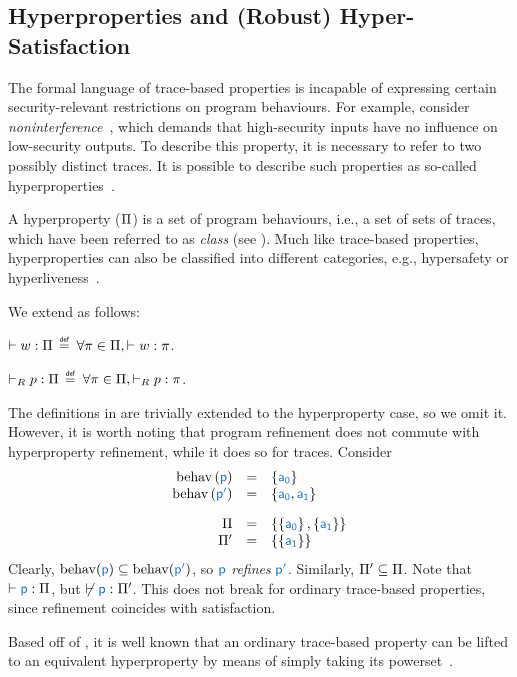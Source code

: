 \subsection{Hyperproperties and (Robust) Hyper-Satisfaction}\label{subsec:bg:hprop}

The formal language of trace-based properties is incapable of expressing certain security-relevant restrictions on program behaviours.
For example, consider {\em noninterference}~\cite{}, which demands that high-security inputs have no influence on low-security outputs.
To describe this property, it is necessary to refer to two possibly distinct traces.
It is possible to describe such properties as so-called hyperproperties~\cite{clarkson2008hyper}.

A hyperproperty ($\Pi$) is a set of program behaviours, i.e., a set of sets of traces, which have been referred to as {\em class} (see ).
Much like trace-based properties, hyperproperties can also be classified into different categories, e.g., hypersafety or hyperliveness~\cite{}.

We extend  as follows:

\begin{definition}\label{def:prophsat}
  $\vdash{w}:{\Pi}$
  $\isdef$
  $\forall\pi\in\Pi,\vdash{w}:{\pi}$.
\end{definition}
\begin{definition}\label{def:proprhsat}
  $\vdash_R{p}:{\Pi}$
  $\isdef$ 
  $\forall\pi\in\Pi,\vdash_R{p}:{\pi}$.
\end{definition}

The definitions in  are trivially extended to the hyperproperty case, so we omit it.
However, it is worth noting that program refinement does not commute with hyperproperty refinement, while it does so for traces.
Consider 
\[
\begin{array}{rcl}
  \operatorname{behav}\left(\src{p}\right) &=& \left\{ \src{\event_0} \right\} \\
  \operatorname{behav}\left(\src{p'}\right) &=& \left\{ \src{\event_0}, \src{\event_1} \right\} \\[.33cm]
  \varHProp &=& \left\{ \left\{ \src{\event_0} \right\}, \left\{ \src{\event_1} \right\} \right\} \\
  \varHProp' &=& \left\{ \left\{ \src{\event_1} \right\} \right\} \\
\end{array}
\]
Clearly, $\operatorname{behav}(\src{p})\subseteq\operatorname{behav}(\src{p'})$, so $\src{p}$ {\em refines} $\src{p'}$.
Similarly, $\Pi'\subseteq\Pi$.
Note that $\sat{\src{p}}{\varHProp}$, but $\not\sat{\src{p}}{\varHProp'}$.
This does not break for ordinary trace-based properties, since refinement coincides with satisfaction.


Based off of , it is well known that an ordinary trace-based property can be lifted to an equivalent hyperproperty by means of simply taking its powerset~\cite{clarkson2008hyper}.

